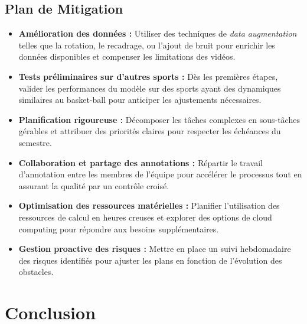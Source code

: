 \subsection{Plan de Mitigation}
\begin{itemize}
    \item \textbf{Amélioration des données :} Utiliser des techniques de \textit{data augmentation} telles que la rotation, le recadrage, ou l’ajout de bruit pour enrichir les données disponibles et compenser les limitations des vidéos.
    \item \textbf{Tests préliminaires sur d’autres sports :} Dès les premières étapes, valider les performances du modèle sur des sports ayant des dynamiques similaires au basket-ball pour anticiper les ajustements nécessaires.
    \item \textbf{Planification rigoureuse :} Décomposer les tâches complexes en sous-tâches gérables et attribuer des priorités claires pour respecter les échéances du semestre.
    \item \textbf{Collaboration et partage des annotations :} Répartir le travail d’annotation entre les membres de l’équipe pour accélérer le processus tout en assurant la qualité par un contrôle croisé.
    \item \textbf{Optimisation des ressources matérielles :} Planifier l’utilisation des ressources de calcul en heures creuses et explorer des options de cloud computing pour répondre aux besoins supplémentaires.
    \item \textbf{Gestion proactive des risques :} Mettre en place un suivi hebdomadaire des risques identifiés pour ajuster les plans en fonction de l’évolution des obstacles.
\end{itemize}

\newpage
\section*{Conclusion}
